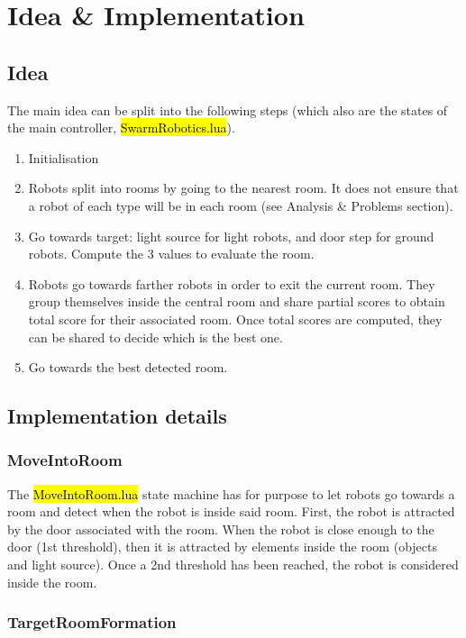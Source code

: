 \section{Idea \& Implementation}

\subsection{Idea}

\noindent The main idea can be split into the following steps (which also are
the states of the main controller, \hl{SwarmRobotics.lua}).

\begin{enumerate}
    \item Initialisation
    \item Robots split into rooms by going to the nearest room. It does not
    ensure that a robot of each type will be in each room (see Analysis \&
    Problems section).
    \item Go towards target: light source for light robots, and door step for
    ground robots. Compute the 3 values to evaluate the room.
    \item Robots go towards farther robots in order to exit the current room.
    They group themselves inside the central room and share partial scores to
    obtain total score for their associated room. Once total scores are computed,
    they can be shared to decide which is the best one.
    \item Go towards the best detected room.
\end{enumerate}

\subsection{Implementation details}

\subsubsection{MoveIntoRoom}

The \hl{MoveIntoRoom.lua} state machine has for purpose to let robots go towards
a room and detect when the robot is inside said room. First, the robot is
attracted by the door associated with the room. When the robot is close enough
to the door (1st threshold), then it is attracted by elements inside the room
(objects and light source). Once a 2nd threshold has been reached, the robot is
considered inside the room.

\subsubsection{TargetRoomFormation}

